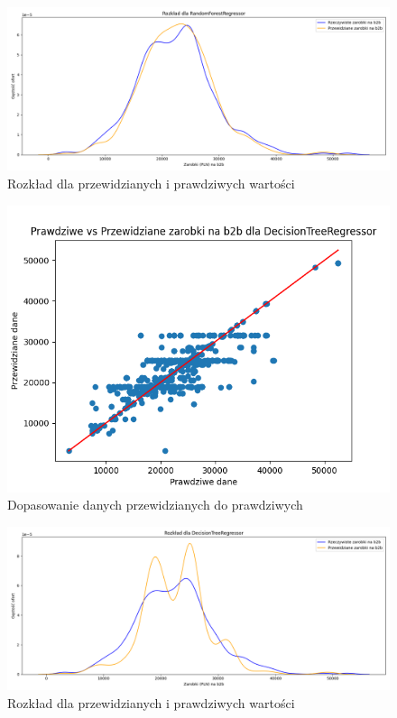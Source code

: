 \documentclass[a4paper]{article}
\begin{document}
\begin{figure}[H]
    \centering
    \includegraphics[width=\textwidth]{../analysis/plots/wyniki/0.8&0.2/b2b/RandomForestRegressor/salary_dist.png}
    \caption{Rozkład dla przewidzianych i prawdziwych wartości}
\end{figure}

\begin{figure}[H]
    \centering
    \includegraphics[width=\textwidth]{../analysis/plots/wyniki/0.8&0.2/b2b/DecisionTreeRegressor/scatter.png}
    \caption{Dopasowanie danych przewidzianych do prawdziwych}
\end{figure}

\begin{figure}[H]
    \centering
    \includegraphics[width=\textwidth]{../analysis/plots/wyniki/0.8&0.2/b2b/DecisionTreeRegressor/salary_dist.png}
    \caption{Rozkład dla przewidzianych i prawdziwych wartości}
\end{figure}
\end{document}
